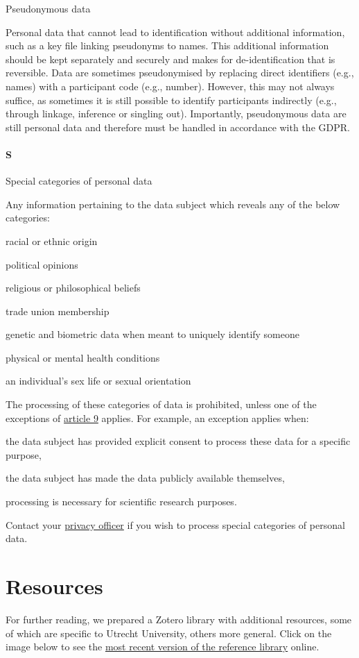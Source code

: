 \documentclass[
]{book}
\begin{document}
Pseudonymous data

Personal data that cannot lead to identification without additional
information, such as a key file linking pseudonyms to names. This additional
information should be kept separately and securely and makes for
de-identification that is reversible. Data are sometimes pseudonymised by
replacing direct identifiers (e.g., names) with a participant code (e.g.,
number). However, this may not always suffice, as sometimes it is still
possible to identify participants indirectly (e.g., through linkage, inference
or singling out). Importantly, pseudonymous data are still personal data and
therefore must be handled in accordance with the GDPR.

\hypertarget{s}{%
\subsubsection{S}\label{s}}

Special categories of personal data

Any information pertaining to the data subject which reveals any of the below categories:

racial or ethnic origin

political opinions

religious or philosophical beliefs

trade union membership

genetic and biometric data when meant to uniquely identify someone

physical or mental health conditions

an individual's sex life or sexual orientation

The processing of these categories of data is prohibited, unless one of
the exceptions of \href{https://gdpr-info.eu/art-9-gdpr/}{article 9}
applies. For example, an exception applies when:

the data subject has provided explicit consent to process these data for
a specific purpose,

the data subject has made the data publicly available themselves,

processing is necessary for scientific research purposes.

Contact your \protect\hyperlink{support}{privacy officer} if you wish to process special categories of personal data.

\hypertarget{references}{%
\chapter{Resources}\label{references}}

For further reading, we prepared a Zotero library with additional resources, some
of which are specific to Utrecht University, others more general. Click on the
image below to see the
\href{https://www.zotero.org/groups/2554340/data_privacy_uu/library}{most recent version of the reference library}
online.

  
\end{document}
